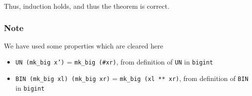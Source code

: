 \documentclass{article}
\begin{document}
{\large Thus, induction holds, and thus the theorem is correct.}

\subsubsection*{Note}
We have used some properties which are cleared here
\begin{itemize}
    \item \texttt{UN (mk\_big x')} = \texttt{mk\_big (\#xr)}, from definition of \texttt{UN} in \texttt{bigint}
    \item \texttt{BIN (mk\_big xl) (mk\_big xr)} = \texttt{mk\_big (xl ** xr)},  from definition of \texttt{BIN} in \texttt{bigint}
\end{itemize}


\end{document}
